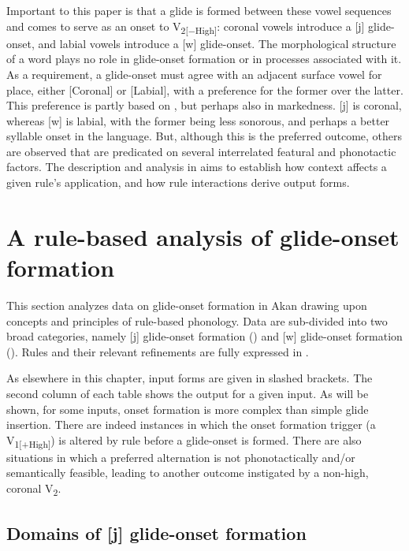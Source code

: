 \documentclass[output=paper,colorlinks,citecolor=brown]{langscibook}
\begin{document}
Important to this paper is that a glide is formed between these vowel sequences and comes to serve as an onset to V\textsubscript{2[−High]}: coronal vowels introduce a [j] glide-onset, and labial vowels introduce a [w] glide-onset. The morphological structure of a word plays no role in glide-onset formation or in processes associated with it. As a requirement, a glide-onset must agree with an adjacent surface vowel for place, either [Coronal] or [Labial], with a preference for the former over the latter. This preference is partly based on , but perhaps also in markedness. [j] is coronal, whereas [w] is labial, with the former being less sonorous, and perhaps a better syllable onset in the language. But, although this is the preferred outcome, others are observed that are predicated on several interrelated featural and phonotactic factors. The description and analysis in  aims to establish how context affects a given rule’s application, and how rule interactions derive output forms.  

\section{A rule-based analysis of glide-onset formation}\label{SEC:DataAkan}\largerpage

This section analyzes data on glide-onset formation in Akan drawing upon concepts and principles of rule-based phonology. Data are sub-divided into two broad categories, namely [j] glide-onset formation () and [w] glide-onset formation (). Rules and their relevant refinements are fully expressed in . 

As elsewhere in this chapter, input forms are given in slashed brackets. The second column of each table shows the output for a given input. As will be shown, for some inputs, onset formation is more complex than simple glide insertion. There are indeed instances in which the onset formation trigger (a V\textsubscript{1[+High]}) is altered by rule before a glide-onset is formed. There are also situations in which a preferred alternation is not phonotactically and/or semantically feasible, leading to another outcome instigated by a non-high, coronal V\textsubscript{2}. 

\subsection{Domains of [j] glide-onset formation} \label{SEC:JFormation}
\end{document}
